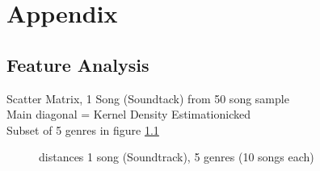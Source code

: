 \documentclass[a4paper,oneside,12pt]{report}
\begin{document}



\chapter{Appendix}

\section{Feature Analysis}

\noindent Scatter Matrix, 1 Song (Soundtack) from 50 song sample\\
Main diagonal = Kernel Density Estimationicked\\
Subset of 5 genres in figure \ref{fig:corr8}\\

\begin{figure}[htbp]
	\centering
	\caption{distances 1 song (Soundtrack), 5 genres (10 songs each)}
	\label{fig:corr8}
\end{figure}
\end{document}
